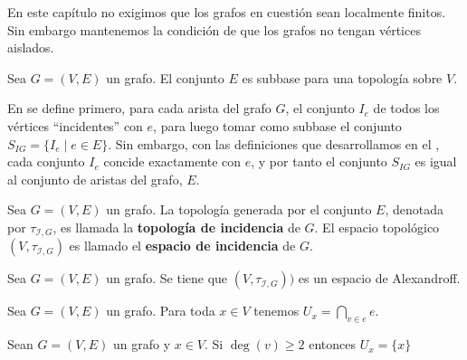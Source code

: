 En este capítulo no exigimos que los grafos en cuestión sean localmente finitos. Sin embargo mantenemos la condición de que los grafos no tengan vértices aislados.
\begin{Prop}
   Sea $G=(V,E)$ un grafo. El conjunto $E$ es subbase para una topología sobre $V$. 
\end{Prop}
En \cite{kilicman2018} se define primero, para cada arista del grafo $G$, el conjunto $I_e$ de todos los vértices ``incidentes'' con $e$, para luego tomar como subbase el conjunto $S_{IG}=\{I_e\mid e\in E\}$. Sin embargo, con las definiciones que desarrollamos en el , cada conjunto $I_e$ concide exactamente con $e$, y por tanto el conjunto $S_{IG}$ es igual al conjunto de aristas del grafo, $E$.
\begin{Def}
   Sea $G=(V,E)$ un grafo. La topología generada por el conjunto $E$, denotada por $\tau_{\mathcal{I},G}$, es llamada la \textbf{topología de incidencia} de $G$. El espacio topológico $(V,\tau_{\mathcal{I},G})$ es llamado el \textbf{espacio de incidencia} de $G$. 
\end{Def}
\begin{Prop}
   Sea $G=(V,E)$ un grafo. Se tiene que $(V,\tau_{\mathcal{I},G}))$ es un espacio de Alexandroff. 
\end{Prop}
\begin{Prop}
   Sea $G=(V,E)$ un grafo. Para toda $x\in V$ tenemos $U_x=\bigcap_{v\in e}e$.
\end{Prop}
\begin{Prop}
   Sean $G=(V,E)$ un grafo y $x\in V$. Si $\operatorname{deg}(v)\ge 2$ entonces $U_x=\{x\}$ 
\end{Prop}

